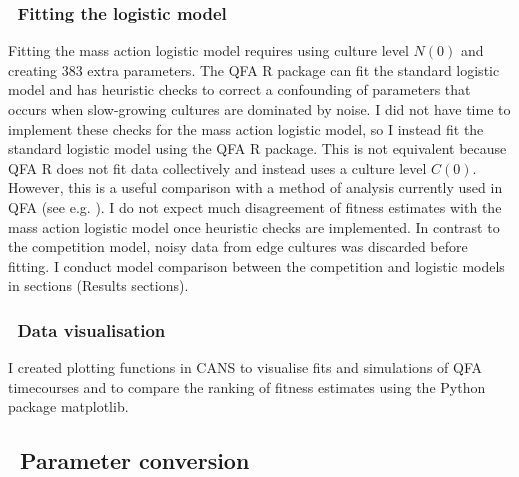 \subsubsection{\thesubsubsection~Fitting the logistic model}

Fitting the mass action logistic model requires using culture level
\(N(0)\) and creating 383 extra parameters. The QFA R package
\citep{qfa2016} can fit the standard logistic model and has heuristic
checks to correct a confounding of parameters that occurs when
slow-growing cultures are dominated by noise. I did not have time to
implement these checks for the mass action logistic model, so I
instead fit the standard logistic model using the QFA R package. This
is not equivalent because QFA R does not fit data collectively and
instead uses a culture level \(C(0)\). However, this is a useful
comparison with a method of analysis currently used in QFA (see
e.g. \citet{Addinall2011}). I do not expect much disagreement of
fitness estimates with the mass action logistic model once heuristic
checks are implemented. In contrast to the competition model, noisy
data from edge cultures was discarded before fitting. I conduct model
comparison between the competition and logistic models in sections
(Results sections).

\subsubsection{\thesubsubsection~Data visualisation}

I created plotting functions in CANS to visualise fits and simulations
of QFA timecourses and to compare the ranking of fitness estimates
using the Python package matplotlib.

\subsection{\thesubsection~Parameter conversion}
\label{sec:parameter_conversion}

